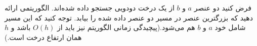 فرض کنید دو عنصر $a$ و $b$ از یک درخت دودویی جستجو داده شده‌اند. الگوریتمی ارائه دهید که بزرگترین عنصر در مسیر دو عنصر داده شده را بیابد. توجه کنید که این مسیر شامل خود $a$ و $b$ هم می‌شود.(پیچیدگی زمانی الگوریتم نیز باید از $O(h)$ باشد و $h$ همان ارتفاع درخت است.)